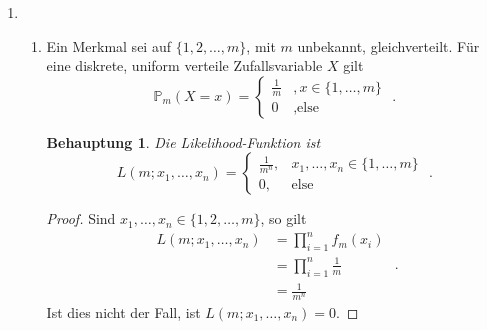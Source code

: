 \documentclass[a4paper]{scrartcl}
\newtheorem*{behaupt}{Behauptung}
\newcommand{\prob}{\mathbb{P}}
\def \blattnr {7}
\begin{document}
\begin{enumerate}[label=\bfseries \blattnr.\arabic*]
\item 
    \begin{enumerate}
        \item 
            Ein Merkmal sei auf $\{1,2,\dotsc, m\}$, mit $m$ unbekannt,
            gleichverteilt.
            Für eine diskrete, uniform verteile Zufallsvariable $X$ gilt
            \begin{equation*}
                \prob_m(X = x) =
                \begin{cases}
                    \frac{1}{m} &, x \in \{1,\dotsc,m\} \\
                    0 &, \text{else}
                \end{cases}
                \text{ .}
            \end{equation*}
            \begin{behaupt}
                Die Likelihood-Funktion ist
                \begin{equation*}
                    L(m; x_1, \dotsc, x_n) = 
                    \begin{cases}
                        \frac{1}{m^n}, & x_1,\dotsc,x_n \in \{1, \dotsc,m\} \\
                        0, & \text{else}
                    \end{cases}
                    \text{ .}
                \end{equation*}
            \end{behaupt}
            \begin{proof}
                Sind $x_1, \dotsc, x_n \in \{1, 2, \dotsc, m\}$, so gilt
                \begin{equation*}
                    \begin{split}
                        L(m; x_1, \dotsc, x_n)
                        &= \prod_{i=1}^n f_m(x_i) \\
                        &= \prod_{i=1}^n \frac{1}{m} \\
                        &= \frac{1}{m^n}
                    \end{split}
                    \text{ .}
                \end{equation*}
                Ist dies nicht der Fall, ist $L(m; x_1, \dotsc, x_n) = 0$.
            \end{proof}


\end{enumerate}
\end{enumerate}
\end{document}
